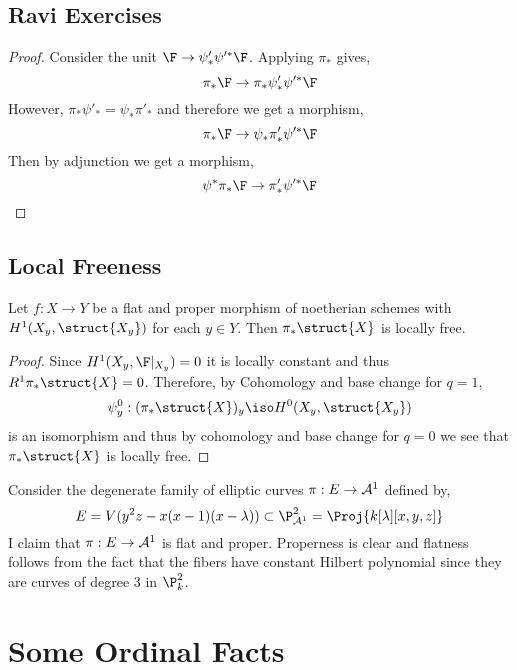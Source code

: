 \documentclass[12pt]{article}
\begin{document}
\subsection{Ravi Exercises}

\begin{prop}[16.3.G.]

\end{prop}

\begin{proof}
Consider the unit $\F \to \psi'_* \psi'^* \F$. Applying $\pi_*$ gives,
\[ \pi_* \F \to \pi_* \psi'_* \psi'^* \F \]
However, $\pi_* \psi'_* = \psi_* \pi'_*$ and therefore we get a morphism,
\[ \pi_* \F \to \psi_* \pi'_* \psi'^* \F \]
Then by adjunction we get a morphism,
\[ \psi^* \pi_* \F \to \pi'_* \psi'^* \F \]
\end{proof}


\subsection{Local Freeness}

\begin{prop}
Let $f : X \to Y$ be a flat and proper morphism of noetherian schemes with $H^1(X_y, \struct{X_y})$ for each $y \in Y$. Then $\pi_* \struct{X}$ is locally free.
\end{prop}

\begin{proof}
Since $H^1(X_y, \F|_{X_y}) = 0$ it is locally constant and thus $R^1 \pi_* \struct{X} = 0$. Therefore, by Cohomology and base change for $q = 1$, \[ \psi^0_y : (\pi_* \struct{X})_y \iso H^0(X_y, \struct{X_y}) \]
is an isomorphism and thus by cohomology and base change for $q = 0$ we see that $\pi_* \struct{X}$ is locally free.
\end{proof}

\begin{example}
Consider the degenerate family of elliptic curves $\pi : E \to \mathcal{A}^1$ defined by,
\[ E = V(y^2 z - x (x - 1)(x - \lambda)) \subset \P^2_{\A^1} = \Proj{k[\lambda][x,y,z]} \]
I claim that $\pi : E \to \mathcal{A}^1$ is flat and proper. Properness is clear and flatness follows from the fact that the fibers have constant Hilbert polynomial since they are curves of degree $3$ in $\P^2_k$. 
\end{example}

\section{Some Ordinal Facts}
\end{document}
